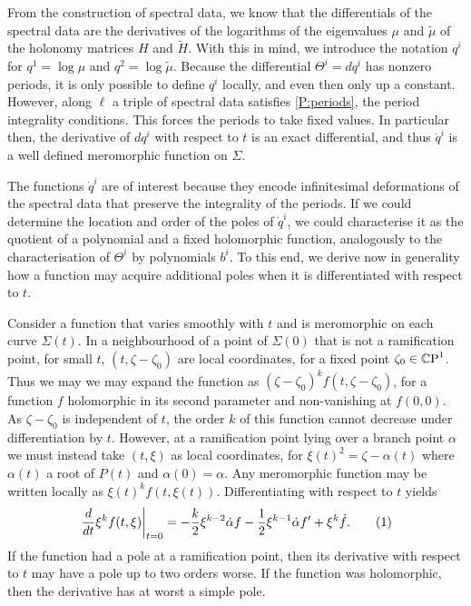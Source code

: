 \documentclass{article}
\begin{document}
From the construction of spectral data, we know that the differentials of the spectral data are the derivatives of the logarithms of the eigenvalues $\mu$ and $\tilde{\mu}$ of the holonomy matrices $H$ and $\tilde{H}$. With this in mind, we introduce the notation $q^i$ for $q^1 = \log \mu$ and $q^2 = \log \tilde{\mu}$. Because the differential $\Theta^i = dq^i$ has nonzero periods, it is only possible to define $q^i$ locally, and even then only up a constant. However, along $\ell$ a triple of spectral data satisfies \ref{P:periods}, the period integrality conditions. This forces the periods to take fixed values. In particular then, the derivative of $dq^i$ with respect to $t$ is an exact differential, and thus $\dot q^i$ is a well defined meromorphic function on $\Sigma$.

The functions $\dot{q}^i$ are of interest because they encode infinitesimal deformations of the spectral data that preserve the integrality of the periods.
If we could determine the location and order of the poles of $\dot{q}^i$, we could characterise it as the quotient of a polynomial and a fixed holomorphic function, analogously to the characterisation of $\Theta^i$ by polynomials $b^i$. To this end, we derive now in generality how a function may acquire additional poles when it is differentiated with respect to $t$.

Consider a function that varies smoothly with $t$ and is meromorphic on each curve $\Sigma(t)$. In a neighbourhood of a point of $\Sigma(0)$ that is not a ramification point, for small $t$, $(t, \zeta - \zeta_0)$ are local coordinates, for a fixed point $\zeta_0 \in \mathbb{C}\text{P}^1$. Thus we may we may expand the function as $(\zeta-\zeta_0)^k f(t,\zeta-\zeta_0)$, for a function $f$ holomorphic in its second parameter and non-vanishing at $f(0,0)$. As $\zeta-\zeta_0$ is independent of $t$, the order $k$ of this function cannot decrease under differentiation by $t$. However, at a ramification point lying over a branch point $\alpha$ we must instead take $(t,\xi)$ as local coordinates, for $\xi(t)^2 = \zeta - \alpha(t)$ where $\alpha(t)$ a root of $P(t)$ and $\alpha(0) = \alpha$. Any meromorphic function may be written locally as $\xi(t)^k f(t,\xi(t))$. Differentiating with respect to $t$ yields
\[
\left . \frac{d}{dt} \xi^k f(t,\xi) \right|_{t=0} = -\frac{k}{2} \xi^{k-2} \dot{\alpha}f - \frac{1}{2}\xi^{k-1}\dot{\alpha}f' + \xi^k \dot{f}.
\labelthis{eqn:pole order}
\]
If the function had a pole at a ramification point, then its derivative with respect to $t$ may have a pole up to two orders worse. If the function was holomorphic, then the derivative has at worst a simple pole.
\end{document}
